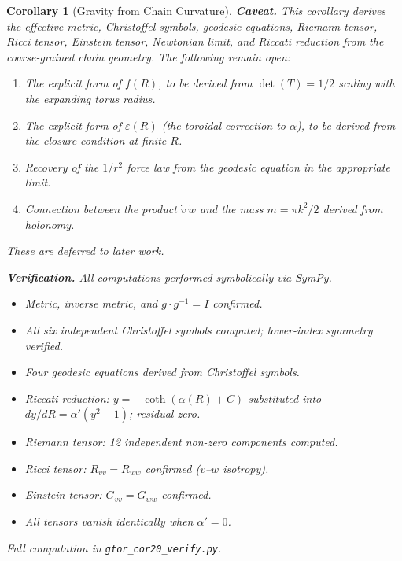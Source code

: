 \documentclass[12pt]{amsart}
\newtheorem{corollary}{Corollary}
\begin{document}
\begin{corollary}[Gravity from Chain Curvature]
\medskip
\textbf{Caveat.}  This corollary derives the effective metric, Christoffel symbols,
geodesic equations, Riemann tensor, Ricci tensor, Einstein tensor, Newtonian limit, and
Riccati reduction from the coarse-grained chain geometry.  The following remain open:
\begin{enumerate}
\item[(a)] The explicit form of $f(R)$, to be derived from $\det(T) = 1/2$ scaling
  with the expanding torus radius.
\item[(b)] The explicit form of $\varepsilon(R)$ (the toroidal correction to $\alpha$),
  to be derived from the closure condition at finite $R$.
\item[(c)] Recovery of the $1/r^2$ force law from the geodesic equation in the appropriate
  limit.
\item[(d)] Connection between the product $\dot{v}\, \dot{w}$ and the mass
  $m = \pi k^2/2$ derived from holonomy.
\end{enumerate}
These are deferred to later work.

\medskip
\textbf{Verification.}  All computations performed symbolically via SymPy.
\begin{itemize}
\item Metric, inverse metric, and $g \cdot g^{-1} = I$ confirmed.
\item All six independent Christoffel symbols computed; lower-index symmetry verified.
\item Four geodesic equations derived from Christoffel symbols.
\item Riccati reduction: $y = -\coth(\alpha(R) + C)$ substituted into $dy/dR =
  \alpha'(y^2 - 1)$; residual zero.
\item Riemann tensor: 12 independent non-zero components computed.
\item Ricci tensor: $R_{vv} = R_{ww}$ confirmed ($v$--$w$ isotropy).
\item Einstein tensor: $G_{vv} = G_{ww}$ confirmed.
\item All tensors vanish identically when $\alpha' = 0$.
\end{itemize}
Full computation in \texttt{gtor\_cor20\_verify.py}.
\end{corollary}
\end{document}
